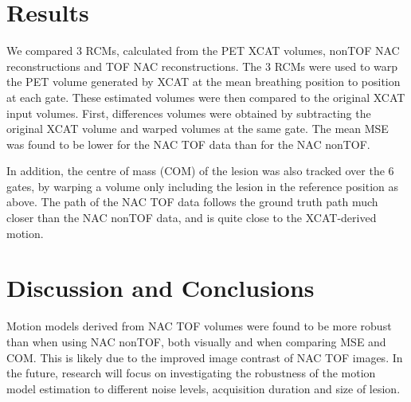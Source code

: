 \documentclass[portrait,color=UCLburgundy,margin=2cm]{uclposter}
\begin{document}
\begin{multicols}{4}
\large

\section*{Results}
We compared $3$ RCMs, calculated from the PET XCAT volumes, nonTOF NAC reconstructions and TOF NAC reconstructions. The $3$ RCMs were used to warp the PET volume generated by XCAT at the mean breathing position to position at each gate. These estimated volumes were then compared to the original XCAT input volumes. First, differences volumes were obtained by subtracting the original XCAT volume and warped volumes at the same gate. The mean MSE was found to be lower for the NAC TOF data than for the NAC nonTOF.

In addition, the centre of mass (COM) of the lesion was also tracked over the $6$ gates, by warping a volume only including the lesion in the reference position as above. The path of the NAC TOF data follows the ground truth path much closer than the NAC nonTOF data, and is quite close to the XCAT-derived motion.

\section*{Discussion and Conclusions}
Motion models derived from NAC TOF volumes were found to be more robust than when using NAC nonTOF, both visually and when comparing MSE and COM. This is likely due to the improved image contrast of NAC TOF images. In the future, research will focus on investigating the robustness of the motion model estimation to different noise levels, acquisition duration and size of lesion.

\AtNextBibliography{\small}
\printbibliography

\end{multicols}
\end{document}
